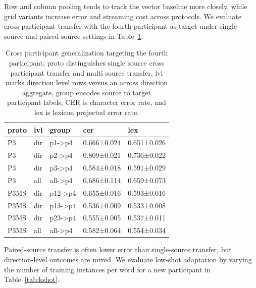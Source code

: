 \documentclass{Interspeech}
\begin{document}
Row and column pooling tends to track the vector baseline more closely, while grid variants increase error and streaming cost across protocols. We evaluate cross-participant transfer with the fourth participant as target under single-source and paired-source settings in Table~\ref{tab:tofour}.
\begin{table}[H]
    \centering
    \small
    \setlength{\tabcolsep}{4pt}
    \caption{Cross participant generalization targeting the fourth participant; proto distinguishes single source cross participant transfer and multi source transfer, lvl marks direction level rows versus an across direction aggregate, group encodes source to target participant labels, CER is character error rate, and lex is lexicon projected error rate.}
    \label{tab:tofour}
    \begin{tabular*}{\columnwidth}{@{\extracolsep{\fill}}lllll}
    \hline
    proto & lvl & group & cer & lex \\
    \hline
    P3 & dir & p1->p4 & 0.666±0.024 & 0.651±0.026 \\
    P3 & dir & p2->p4 & 0.809±0.021 & 0.736±0.022 \\
    P3 & dir & p3->p4 & 0.584±0.018 & 0.591±0.029 \\
    P3 & all & all->p4 & 0.686±0.114 & 0.659±0.073 \\
    P3MS & dir & p12->p4 & 0.655±0.016 & 0.593±0.016 \\
    P3MS & dir & p13->p4 & 0.536±0.009 & 0.533±0.008 \\
    P3MS & dir & p23->p4 & 0.555±0.005 & 0.537±0.011 \\
    P3MS & all & all->p4 & 0.582±0.064 & 0.554±0.034 \\
    \hline
    \end{tabular*}
    \end{table}
Paired-source transfer is often lower error than single-source transfer, but direction-level outcomes are mixed.
We evaluate low-shot adaptation by varying the number of training instances per word for a new participant in Table~\ref{tab:kshot}.
\end{document}

